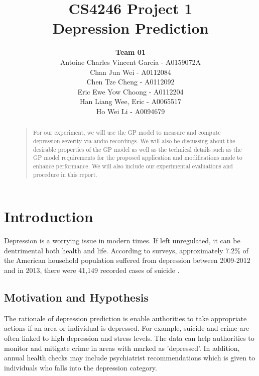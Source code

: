 \documentclass{article}
\title{
	CS4246 Project 1\\ Depression Prediction
}
\author{
	{\bf Team 01} \\
	Antoine Charles Vincent Garcia - A0159072A\\
	Chan Jun Wei - A0112084\\
	Chen Tze Cheng - A0112092\\
	Eric Ewe Yow Choong - A0112204\\
	Han Liang Wee, Eric - A0065517\\
	Ho Wei Li - A0094679\\
}
\begin{document}
 	\maketitle

	\begin{abstract}
	\begin{quote}
	For our experiment, we will use the GP model to measure and compute depression severity via audio recordings. 
	We will also be discussing about the desirable properties of the GP model as well as the technical details such as the 
	GP model requirements for the proposed application and modifications made to enhance performance. 
	We will also include our experimental evaluations and procedure in this report. \\
	\end{quote}
	\end{abstract}
	
	\section{Introduction}
	Depression is a worrying issue in modern times. 
	If left unregulated, it can be dentrimental both health and life.
	According to surveys, approximately 7.2\% of the American household population suffered from depression between 2009-2012 \cite{nchs2014} and
	in 2013, there were 41,149 recorded cases of suicide \cite{nvsr2016}. \\

	\subsection{Motivation and Hypothesis}
	The rationale of depression prediction is enable authorities to take appropriate actions if an area or individual is depressed. 
	For example, suicide and crime are often linked to high depression and stress levels. The data can help authorities to monitor and mitigate crime in areas with marked as 'depressed'. 
	In addition, annual health checks may include psychiatrist recommendations which is given to individuals who falls into the depression category. 
\end{document}
